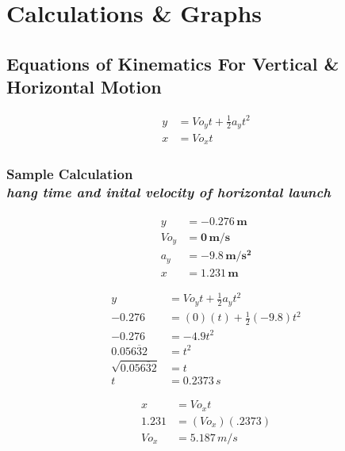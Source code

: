 
\section{Calculations \& Graphs}

\vspace{-0.5cm}
\singlespacing


\subsection{Equations of Kinematics For Vertical \& Horizontal Motion} 

\begin{align}
	y &= V\!o_yt + \frac{1}{2}a_yt^2 \label{eq:YMotion} \\
	x &= V\!o_xt \label{eq:XMotion}
\end{align}

\subsubsection{Sample Calculation \\ {\normalfont \small\textit{hang time and inital velocity of horizontal launch}}}

{\centering
{}
\begin{align*}
	y &= \boldsymbol{-0.276\,m} \\
	V\!o_y &= \boldsymbol{0\,m/s} \\
	a_y &= \boldsymbol{-9.8\,m/s^2} \\
	x &= \boldsymbol{1.231\,m}
\end{align*}

\begin{align*}
	y &= V\!o_yt + \frac{1}{2}a_yt^2 \\
	-0.276 &= (0)(t) + \frac{1}{2}(-9.8)t^2 \\
	-0.276 &= -4.9t^2 \\
	0.05\overline{632} &= t^2 \\
	\sqrt{0.05\overline{632}} &= t \\ 
	t &= \boxed{0.2373\,s}
\end{align*}

\begin{align*}
	x &= V\!o_xt \\ 
	1.231 &= (V\!o_x)(.2373) \\
	V\!o_x &= \boxed{5.187\,m/s}
\end{align*}}

